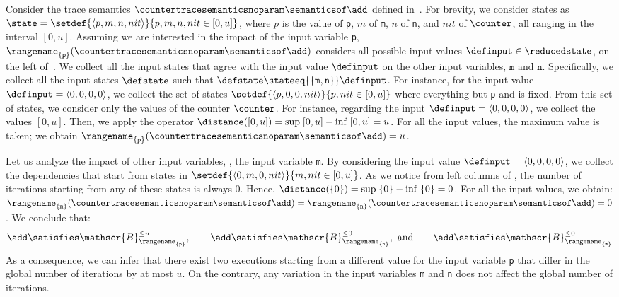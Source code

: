 \begin{example}
  Consider the trace semantics $\countertracesemanticsnoparam\semanticsof\add$ defined in~.
  For brevity, we consider states as $\state = \setdef{\langle p, m, n, nit \rangle}{p, m, n, nit\in[0, u]}$,
  where $p$ is the value of \texttt{p}, $m$ of \texttt{m}, $n$ of \texttt{n}, and $nit$ of $\counter$, all ranging in the interval $[0, u]$.
  Assuming we are interested in the impact of the input variable \texttt{p}, $\rangename_{\{\texttt{p}\}}(\countertracesemanticsnoparam\semanticsof\add)$ considers all possible input values $\definput\in\reducedstate$, on the left of~.
  We collect all the input states that agree with the input value $\definput$ on the other input variables, \cf{} $\texttt{m}$ and $\texttt{n}$.
  Specifically, we collect all the input states $\defstate$ such that $\defstate\stateeq{\{\texttt{m},\texttt{n}\}}\definput$.
  For instance, for the input value $\definput = \langle 0, 0, 0, 0\rangle$, we collect the set of states $\setdef{\langle p, 0, 0, nit\rangle}{p, nit\in[0, u]}$ where everything but \texttt{p} and \counter{} is fixed.
  From this set of states, we consider only the values of the counter $\counter$.
  For instance, regarding the input $\definput = \langle 0, 0, 0, 0\rangle$, we collect the values $[0, u]$.
  Then, we apply the operator $\distance([0, u]) = \sup\; [0, u] - \inf\; [0, u] = u$.
  For all the input values, the maximum value is taken; we obtain $\rangename_{\{\texttt{p}\}}(\countertracesemanticsnoparam\semanticsof\add)= u$.


  Let us analyze the impact of other input variables, \eg{}, the input variable \texttt{m}.
  By considering the input value $\definput = \langle 0, 0, 0, 0\rangle$, we collect the dependencies that start from states in $\setdef{\langle 0, m, 0, nit\rangle}{m, nit\in[0, u]}$. As we notice from left columns of , the number of iterations starting from any of these states is always $0$.
  Hence, $\distance(\{0\}) = \sup\; \{0\} - \inf\; \{0\} = 0$.
  For all the input values, we obtain: $\rangename_{\{\texttt{m}\}}(\countertracesemanticsnoparam\semanticsof\add)=\rangename_{\{\texttt{n}\}}(\countertracesemanticsnoparam\semanticsof\add)=0$.
%
  We conclude that:
  \[ \add \satisfies \mathscr{B}^{\le u}_{\rangename_{\{\texttt{p}\}}}, \qquad \add \satisfies \mathscr{B}^{\le 0}_{\rangename_{\{\texttt{n}\}}},\text{ and} \qquad \add \satisfies \mathscr{B}^{\le 0}_{\rangename_{\{\texttt{m}\}}}\]
  As a consequence, we can infer that there exist two executions starting from a different value for the input variable \texttt{p} that differ in the global number of iterations by at most $u$. On the contrary, any variation in the input variables \texttt{m} and \texttt{n} does not affect the global number of iterations.
\end{example}


